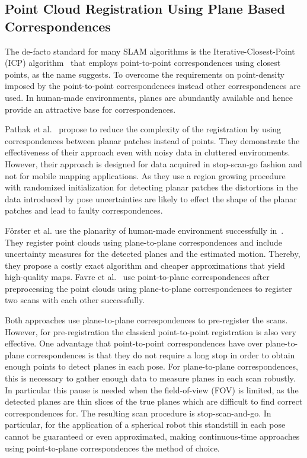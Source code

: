\subsection{Point Cloud Registration Using Plane Based Correspondences}

The de-facto standard for many SLAM algorithms is the Iterative-Closest-Point (ICP) algorithm~\cite{Besl1992} that employs point-to-point correspondences using closest points, as the name suggests. 
To overcome the requirements on point-density imposed by the point-to-point corres\-pon\-den\-ces instead other correspondences are used. 
In human-made environments, planes are abundantly available and hence provide an attractive base for correspondences.

Pathak et al.~\cite{Pathak:2010} propose to reduce the complexity of the registration by using correspondences between planar patches instead of points.
They demonstrate the effectiveness of their approach even with noisy data in cluttered environments.
However, their approach is designed for data acquired in stop-scan-go fashion and not for mobile mapping applications.
As they use a region growing procedure with randomized initialization for detecting planar patches the distortions in the data introduced by pose uncertainties are likely to effect the shape of the planar patches and lead to faulty correspondences.

Förster et al. use the planarity of human-made environment successfully in~\cite{Foerstner2017}.
They register point clouds using plane-to-plane correspondences and include uncertainty measures for the detected planes and the estimated motion.
Thereby, they propose a costly exact algorithm and cheaper approximations that yield high-quality maps.
Favre et al.~\cite{favre2021} use point-to-plane correspondences after preprocessing the point clouds using plane-to-plane correspondences to register two scans with each other successfully.

Both approaches use plane-to-plane correspondences to pre-register the scans.
However, for pre-registration the classical point-to-point registration is also very effective. 
One advantage that point-to-point correspondences have over plane-to-plane correspondences is that they do not require a long stop in order to obtain enough points to detect planes in each pose.
For plane-to-plane correspondences, this is necessary to gather enough data to measure planes in each scan robustly. 
In particular this pause is needed when the field-of-view (FOV) is limited, as the detected planes are thin slices of the true planes which are difficult to find correct correspondences for. 
The resulting scan procedure is stop-scan-and-go.
In particular, for the application of a spherical robot this standstill in each pose cannot be guaranteed or even approximated, making continuous-time approaches using point-to-plane correspondences the method of choice.

